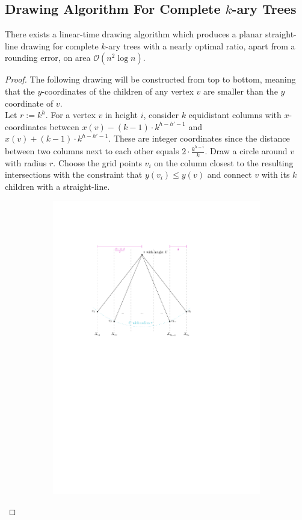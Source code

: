 \subsection{Drawing Algorithm For Complete $k$-ary Trees}


\begin{theorem}
	There exists a linear-time drawing algorithm which produces a planar straight-line drawing for complete $k$-ary trees with a nearly optimal ratio, apart from a rounding error, on area $\mathcal{O}(n^2\log n)$.
\end{theorem}
\begin{proof}
	The following drawing will be constructed from top to bottom, meaning that the $y$-coordinates of the children of any vertex $v$ are smaller than the $y$ coordinate of $v$.\\
	Let $r := k^h$. For a vertex $v$ in height $i$, consider $k$ equidistant columns with $x$-coordinates between $x(v) - (k-1)\cdot  k^{h-h'-1}$ and $x(v) + (k-1)\cdot  k^{h-h'-1}$. These are integer coordinates since the distance between two columns next to each other equals $2\cdot \frac{k^{h-i}}{k}$. Draw a circle around $v$ with radius $r$. Choose the grid points $v_i$ on the column closest to the resulting intersections with the constraint that $y(v_i) \leq y(v)$ and connect $v$ with its $k$ children with a straight-line.
\begin{figure}[H]
	\centering
		\begin{subfigure}{\textwidth}
			\centering
			\includegraphics[page=1,width=0.6\linewidth]{graphics/k-ary_tree_algorithm_construction.pdf}

\end{subfigure}
\end{figure}
\end{proof}
